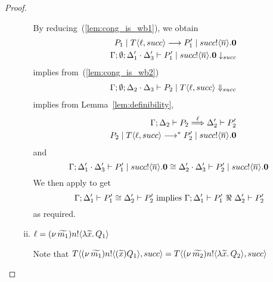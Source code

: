 \begin{proof}
\begin{enumerate}
\begin{enumerate}[i.]
						\noi By reducing~(\ref{lem:cong_is_wb1}), we obtain
						\begin{eqnarray*}
							&& P_1 \;|\; T\langle \ell, succ \rangle \longrightarrow P_1' \;|\; succ ! \langle \overline{n} \rangle . \mathbf{0} \\
							&& \Gamma; \emptyset; \Delta_1' \cdot \Delta_3' \vdash P_1' \;|\; succ ! \langle \overline{n} \rangle . \mathbf{0} \downarrow_{succ}
						\end{eqnarray*}
						\noi implies from~(\ref{lem:cong_is_wb2})
						\begin{eqnarray*}
							&& \Gamma; \emptyset; \Delta_2 \cdot \Delta_3 \vdash P_2 \;|\; T\langle \ell, succ \rangle \Downarrow_{succ}
						\end{eqnarray*}
						\noi implies from Lemma~\ref{lem:definibility},
						\begin{eqnarray*}
							&& \Gamma; \Delta_2 \vdash P_2 \stackrel{\ell}{\Longrightarrow} \Delta_2' \vdash P_2'\\
							&& P_2 \;|\; T \langle \ell, succ \rangle \longrightarrow^{*} P_2' \;|\; succ ! \langle \overline{n} \rangle . \mathbf{0}
						\end{eqnarray*}
						\noi and
						\[
							\Gamma; \Delta_1' \cdot \Delta_3' \vdash P_1' \;|\; succ ! \langle \overline{n} \rangle .\mathbf{0} \cong \Delta_2' \cdot \Delta_3' \vdash P_2' \;|\; succ ! \langle \overline{n} \rangle . \mathbf{0}
						\]
						We then apply  to get
						\[
							\horel{\Gamma}{\Delta_1'}{P_1'}{\cong}{\Delta_2'}{P_2'} \text{ implies } \horel{\Gamma}{\Delta_1'}{P_1'}{\ \Re\ }{\Delta_2'}{P_2'}
						\]
						\noi as required.

				\item	$\ell = (\nu\, \widetilde{m_1}) n ! \langle \lambda \widetilde{x}.\,Q_1 \rangle$

						\noi Note that $T\langle (\nu\, \widetilde{m_1}) n ! \langle (\widetilde{x}) Q_1 \rangle, succ \rangle = T\langle (\nu\, \widetilde{m_2}) n ! \langle \lambda \widetilde{x}.\,Q_2 \rangle, succ \rangle$


\end{enumerate}
\end{enumerate}
\end{proof}
